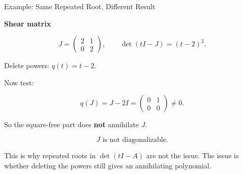 \documentclass[10pt]{beamer}
\theoremstyle{definition}
\newcommand{\x}[1]{\alert{\textbf{#1}}}
\begin{document}
\begin{frame}[shrink=5]{Example: Same Repeated Root, Different Result}

\x{Shear matrix}

$$J=\begin{pmatrix}2&1\\0&2\end{pmatrix}, \qquad \det(tI-J)=(t-2)^2.$$

\vfill

Delete powers: $q(t)=t-2$.

\vfill

Now test:

$$q(J)=J-2I=\begin{pmatrix}0&1\\0&0\end{pmatrix}\neq 0.$$

\vfill

So the square-free part does \x{not} annihilate $J$.

\vfill

$$\boxed{J\text{ is not diagonalizable.}}$$

\vfill

This is why repeated roots in $\det(tI-A)$ are not the issue. The issue is whether deleting the powers still gives an annihilating polynomial.

\end{frame}
\end{document}
